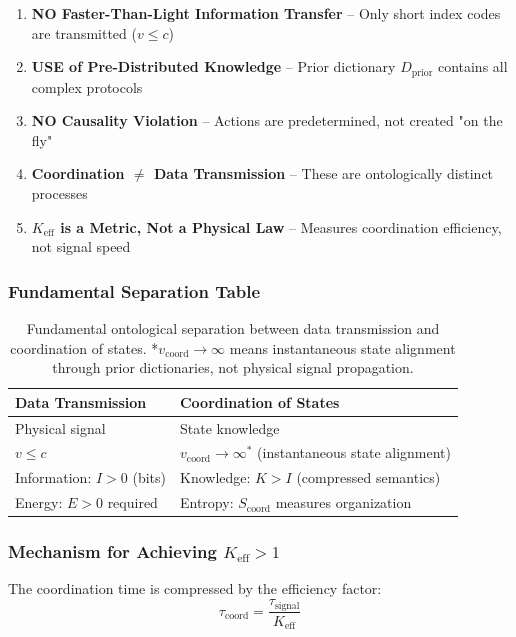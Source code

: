 \documentclass[11pt,a4paper]{article}
\begin{document}
	\begin{enumerate}[leftmargin=*]
		\item \textbf{NO Faster-Than-Light Information Transfer} – Only short index codes are transmitted ($v \leq c$)
		\item \textbf{USE of Pre-Distributed Knowledge} – Prior dictionary $D_{\text{prior}}$ contains all complex protocols
		\item \textbf{NO Causality Violation} – Actions are predetermined, not created "on the fly"
		\item \textbf{Coordination $\neq$ Data Transmission} – These are ontologically distinct processes
		\item \textbf{$K_{\mathrm{eff}}$ is a Metric, Not a Physical Law} – Measures coordination efficiency, not signal speed
	\end{enumerate}
	
	\subsubsection{Fundamental Separation Table}
	
	\begin{table}[H]
		\centering
		\begin{tabular}{|p{}|p{}|}
			\hline
			\textbf{Data Transmission} & \textbf{Coordination of States} \\
			\hline
			Physical signal & State knowledge \\
			$v \leq c$ & $v_{\text{coord}} \to \infty^*$ (instantaneous state alignment) \\
			Information: $I > 0$ (bits) & Knowledge: $K > I$ (compressed semantics) \\
			Energy: $E > 0$ required & Entropy: $S_{\text{coord}}$ measures organization \\
			\hline
		\end{tabular}
		\caption{Fundamental ontological separation between data transmission and coordination of states. *$v_{\text{coord}} \to \infty$ means instantaneous state alignment through prior dictionaries, not physical signal propagation.}
		\label{tab:coordination-vs-data}
	\end{table}
	
	\subsubsection{Mechanism for Achieving $K_{\mathrm{eff}} > 1$}
	
	The coordination time is compressed by the efficiency factor:
	\begin{equation}
		\tau_{\text{coord}} = \frac{\tau_{\text{signal}}}{K_{\mathrm{eff}}}
	\end{equation}
	
\end{document}
